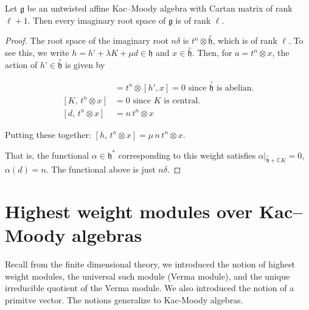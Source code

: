 \documentclass[12pt]{article}
\begin{document}
\begin{corollary}
    Let $\mathfrak{g}$ be an untwisted affine Kac–Moody algebra with Cartan matrix of rank $\ell+1$. Then every imaginary root space of $\mathfrak{g}$ is of rank $\ell$.
\end{corollary}

\begin{proof}
    The root space of the imaginary root $n\delta$ is $t^n \otimes \overset{\circ}{\mathfrak{h}}$, which is of rank $\ell$. To see this, we write  $h = h’ + \lambda K + \mu d \in \mathfrak{h}$ and $x \in \overset{\circ}{\mathfrak{h}}$. Then, for $a = t^n \otimes x$, the action of $h’ \in \overset{\circ}{\mathfrak{h}}$ is given by

    \begin{align*}
        [h',\, t^n \otimes x]
                             & = t^n \otimes [h',x] = 0 \text{ since $\overset{\circ}{\mathfrak{h}}$ is abelian.} \\
        [K,\, t^n \otimes x] & = 0 \text{ since $K$ is central.}                                                  \\
        [d,\, t^n \otimes x] & = n\,t^n \otimes x
    \end{align*}

    Putting these together:
    $[h,\, t^n \otimes x] = \mu\,n\,t^n \otimes x$.

    That is, the functional $\alpha \in \mathfrak{h}^*$ corresponding to this weight satisfies $\alpha|_{\overset{\circ}{\mathfrak{h}} + \mathbb{C}K} = 0$,
    $\alpha(d) = n$. The functional above is just $n\delta$.
\end{proof}

\section{Highest weight modules over Kac–Moody algebras}
Recall from the finite dimensional theory, we introduced the notion of highest weight modules, the universal such module (Verma module), and the unique irreducible quotient of the Verma module. We also introduced the notion of a primitve vector. The notions generalize to Kac-Moody algebras.
\end{document}
